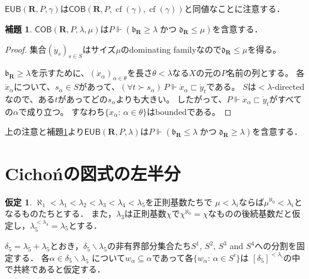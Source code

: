 \documentclass[uplatex,dvipdfmx]{jsarticle}
\newcommand\forces{\Vdash}
\newcommand{\AND}{\mathbin{\text{かつ}}}
\newcommand{\frakb}{\mathfrak{b}}
\newcommand{\frakd}{\mathfrak{d}}
\newcommand{\cf}{\operatorname{cf}}
\newcommand{\EUB}{\mathsf{EUB}}
\newcommand{\COB}{\mathsf{COB}}
\newcommand{\relR}{\mathbf{R}}
\renewcommand{\setminus}{\smallsetminus}
\theoremstyle{definition}
\newtheorem{lem}[thm]{補題}
\newtheorem{assumption}[thm]{仮定}
\begin{document}
	$\EUB(\relR, P, \gamma)$は$\COB(\relR, P, \cf(\gamma), \cf(\gamma))$と同値なことに注意する．
	
	\begin{lem}\label{lem:cobimpliesineq}
		$\COB(\relR, P, \lambda, \mu)$は$P \forces (\frakb_\relR \ge \lambda \AND \frakd_\relR \le \mu)$を含意する．
	\end{lem}
	\begin{proof}
		集合$(\dot{y}_s)_{s\in S}$はサイズ$\mu$のdominating familyなので$\mathfrak{d}_\relR\le \mu$を得る。

		$\mathfrak{b}_\relR \ge \lambda$を示すために、$(\dot{x}_\alpha)_{\alpha\in\theta}$を長さ$\theta<\lambda$なる$X$の元の$P$名前の列とする。
		各$\dot{x}_\alpha$について、$s_\alpha\in S$があって、$(\forall t\succ s_\alpha)\, P\forces \dot{x}_\alpha \sqsubset \dot{y}_t$である。
		$S$は${<}\lambda$-directedなので、ある$t$があってどの$s_\alpha$よりも大きい。
		したがって、$P\forces \dot{x}_\alpha \sqsubset \dot{y}_t $がすべての$\alpha$で成り立つ。
		すなわち$\{\dot{x}_\alpha:\, \alpha\in\theta\}$はboundedである。
	\end{proof}

	上の注意と補題\ref{lem:cobimpliesineq}より$\EUB(\relR, P, \lambda)$は$P \forces (\frakb_\relR \le \lambda \AND \frakd_\relR \ge \lambda)$を含意する．
	
	\section{Cichońの図式の左半分}
	
	\begin{assumption}\label{asm:P}
		$\aleph_1<\lambda_1<\lambda_2<\lambda_3<\lambda_4<\lambda_5$を正則基数たちで
		$\mu<\lambda_i$ならば$\mu^{\aleph_0}<\lambda_i$となるものたちとする．
		また，$\lambda_3$は正則基数$\chi$で$\chi^{\aleph_0}=\chi$なものの後続基数だと仮定し，$\lambda_5^{<\lambda_4}=\lambda_5$とする．
		
		$\delta_5=\lambda_5+\lambda_5$とおき，$\delta_5\setminus\lambda_5$の非有界部分集合たち$S^1$, $S^2$, $S^3$ and $S^4$への分割を固定する．
		各$\alpha\in \delta_5\setminus\lambda_5$ について$w_\alpha\subseteq \alpha$であって各$\{w_\alpha:\, \alpha\in S^i\}$は $[\delta_5]^{{<}\lambda_i}$の中で共終であると仮定する．
	\end{assumption}
	
\end{document}
